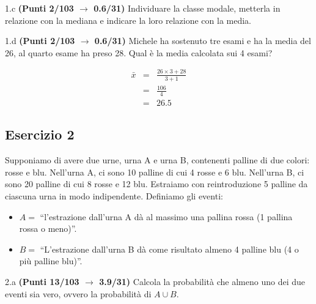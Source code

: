 \documentclass[
  11pt,
]{book}
\providecommand{\tightlist}{%
  \setlength{\itemsep}{0pt}\setlength{\parskip}{0pt}}
\theoremstyle{mytheoremstyle}
\theoremstyle{mydefstyle}
\newenvironment{sol}
  {
  \begin{tcolorbox}[enhanced,breakable,arc=0.1mm,boxrule=1pt,colback=white,colframe=iblue,
  title=\bf \fontfamily{lmss}\selectfont \hspace{.5 cm} Soluzione,drop fuzzy shadow]

}{
\end{tcolorbox}
  }
\begin{document}
1.c \textbf{(Punti 2/103 \(\rightarrow\) 0.6/31)} Individuare la classe modale, metterla in relazione con la mediana e indicare la loro relazione con la media.

1.d \textbf{(Punti 2/103 \(\rightarrow\) 0.6/31)} Michele ha sostenuto tre esami e ha la media del 26, al quarto esame ha preso 28. Qual è la media calcolata sui 4 esami?

\begin{sol}
\begin{eqnarray*}
  \bar x &=&\frac {26\times 3+28}{3+1}\\
  &=& \frac {106}{4}\\
  &=& 26.5
\end{eqnarray*}

\end{sol}

\subsection{Esercizio 2}\label{esercizio-2-33}

Supponiamo di avere due urne, urna A e urna B, contenenti palline di due colori: rosse e blu.
Nell'urna A, ci sono 10 palline di cui 4 rosse e 6 blu. Nell'urna B, ci sono 20 palline di cui 8 rosse e 12 blu.
Estraiamo con reintroduzione 5 palline da ciascuna urna in modo indipendente.
Definiamo gli eventi:

\begin{itemize}
\tightlist
\item
  \(A=\) ``l'estrazione dall'urna A dà al massimo una pallina rossa (1 pallina rossa o meno)''.
\item
  \(B=\) ``L'estrazione dall'urna B dà come risultato almeno 4 palline blu (4 o più palline blu)''.
\end{itemize}

2.a \textbf{(Punti 13/103 \(\rightarrow\) 3.9/31)} Calcola la probabilità che almeno uno dei due eventi sia vero, ovvero la probabilità di \(A \cup B\).
\end{document}
